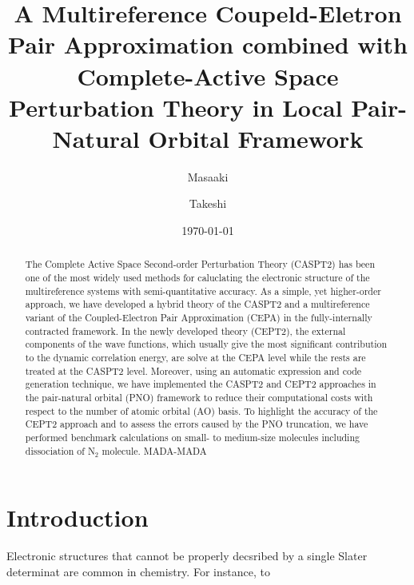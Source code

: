 \documentclass[aip,jcp,amsmath,twocolumn,floatfix,reprint,fleqn]{revtex4-1}
\begin{document}
\title{\color{blue}
  A Multireference Coupeld-Eletron Pair Approximation combined with Complete-Active Space Perturbation Theory in Local Pair-Natural Orbital Framework}
\date{\today}
\author{Masaaki }

\author{Takeshi }

\begin{abstract}  
  The Complete Active Space Second-order Perturbation Theory (CASPT2) has been one of the most widely used methods for caluclating the electronic structure of the multireference systems with semi-quantitative accuracy.
  As a simple, yet higher-order approach, we have developed a hybrid theory of the CASPT2 and a multireference variant of the Coupled-Electron Pair Approximation (CEPA) in the fully-internally contracted framework.
  In the newly developed theory (CEPT2), the external components of the wave functions, which usually give the most significant contribution to the dynamic correlation energy, are solve at the CEPA level while the rests are treated at the CASPT2 level.
  Moreover, using an automatic expression and code generation technique, we have implemented the CASPT2 and CEPT2 approaches in the pair-natural orbital (PNO) framework to reduce their computational costs with respect to the number of atomic orbital (AO) basis.
  To highlight the accuracy of the CEPT2 approach and to assess the errors caused by the PNO truncation, we have performed benchmark calculations on small- to medium-size molecules including dissociation of N${}_2$ molecule.
  MADA-MADA
  
\end{abstract}

\maketitle

\section{Introduction}
%
Electronic structures that cannot be properly decsribed by a single Slater determinat are common in chemistry.
%
For instance, to 
%
\end{document}
